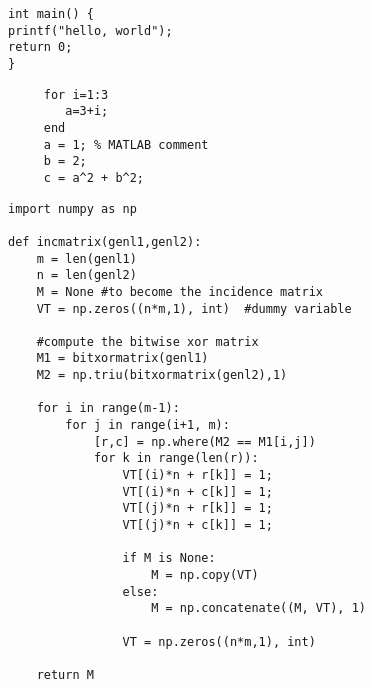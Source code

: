\documentclass{article}
\begin{document}
\begin{verbatim}
int main() {
printf("hello, world");
return 0;
}
\end{verbatim}

\begin{verbatim}
	 for i=1:3
	 	a=3+i;
	 end
	 a = 1; % MATLAB comment 
	 b = 2; 
	 c = a^2 + b^2;
\end{verbatim}

\begin{verbatim}
import numpy as np
 
def incmatrix(genl1,genl2):
    m = len(genl1)
    n = len(genl2)
    M = None #to become the incidence matrix
    VT = np.zeros((n*m,1), int)  #dummy variable
 
    #compute the bitwise xor matrix
    M1 = bitxormatrix(genl1)
    M2 = np.triu(bitxormatrix(genl2),1) 
 
    for i in range(m-1):
        for j in range(i+1, m):
            [r,c] = np.where(M2 == M1[i,j])
            for k in range(len(r)):
                VT[(i)*n + r[k]] = 1;
                VT[(i)*n + c[k]] = 1;
                VT[(j)*n + r[k]] = 1;
                VT[(j)*n + c[k]] = 1;
 
                if M is None:
                    M = np.copy(VT)
                else:
                    M = np.concatenate((M, VT), 1)
 
                VT = np.zeros((n*m,1), int)
 
    return M
\end{verbatim}

\begin{verbatim}

\end{verbatim}
\end{document}
